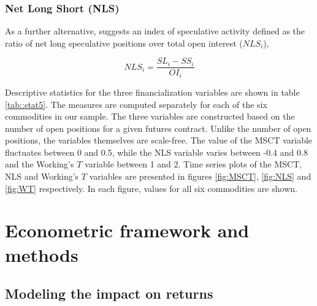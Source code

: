 \documentclass[12pt]{article}
\begin{document}
\subsubsection{Net Long Short (NLS)}
As a further alternative, \citet{hedegaard2011margins} suggests an index of speculative activity defined as the ratio of net long speculative positions over total open interest ($NLS_i$),

\begin{equation} \label{eqn:NLS}
NLS_i=\frac{SL_i-SS_i}{OI_i}
\end{equation}

Descriptive statistics for the three financialization variables are shown in table \ref{tab::stat5}. The measures are computed separately for each of the six commodities in our sample. The three variables are constructed based on the number of open positions for a given futures contract. Unlike the number of open positions, the variables themselves are scale-free. The value of the MSCT variable fluctuates between 0 and 0.5, while the NLS variable varies between -0.4 and 0.8 and the Working's $T$ variable between 1 and 2. Time series plots of the MSCT, NLS and Working's $T$ variables are presented in figures \ref{fig:MSCT}, \ref{fig:NLS} and \ref{fig:WT} respectively. In each figure, values for all six commodities are shown. 







\section{Econometric framework and methods}
\subsection{Modeling the impact on returns}\label{return}

\end{document}
